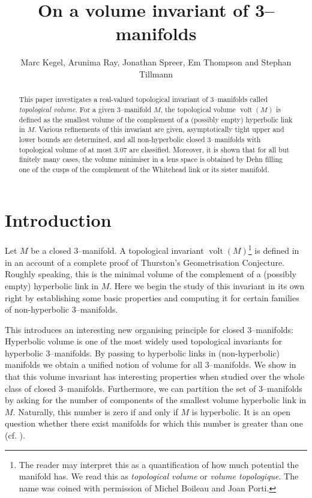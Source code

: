 \documentclass[a4paper]{gtart}
\theoremstyle{definition}
\theoremstyle{remark}
\numberwithin{equation}{section}
\DeclareMathOperator{\volt}{volt}
\begin{document}
\title{On a volume invariant of 3--manifolds}
\author{Marc Kegel, Arunima Ray, Jonathan Spreer, Em Thompson and Stephan Tillmann}

\begin{abstract}
This paper investigates a real-valued topological invariant of $3$--manifolds called \emph{topological volume}. For a given $3$--manifold $M$, the topological volume $\volt(M)$ is defined as the smallest volume of the complement of a (possibly empty) hyperbolic link in $M$. Various refinements of this invariant are given, asymptotically tight upper and lower bounds are determined, and all non-hyperbolic closed $3$--manifolds with topological volume of at most $3.07$ are classified. Moreover, it is shown that for all but finitely many cases, the volume minimiser in a lens space is obtained by Dehn filling one of the cusps of the complement of the Whitehead link or its sister manifold.
\end{abstract}



\makeshorttitle


\section{Introduction}

Let $M$ be a closed 3--manifold.
A topological invariant $\volt(M)$\footnote{The reader may interpret this as a quantification of how much potential the manifold has. We read this as \emph{topological volume} or \emph{volume topologique}. The name was coined with permission of Michel Boileau and Joan Porti.} is defined in~\cite{BBBMP} in an account of a complete proof of Thurston's Geometrisation Conjecture. Roughly speaking, this is the minimal volume of the complement of a (possibly empty) hyperbolic link in $M.$ Here we begin the study of this invariant in its own right by establishing some basic properties and computing it for certain families of non-hyperbolic 3--manifolds.

This introduces an interesting new organising principle for closed $3$--manifolds: Hyperbolic volume is one of the most widely used topological invariants for hyperbolic $3$--manifolds. By passing to hyperbolic links in (non-hyperbolic) manifolds we obtain a unified notion of volume for all $3$--manifolds. We show in  that this volume invariant has interesting properties when studied over the whole class of closed 3--manifolds. Furthermore, we can partition the set of $3$--manifolds by asking for the number of components of the smallest volume hyperbolic link in $M$. Naturally, this number is zero if and only if $M$ is hyperbolic. It is an open question whether there exist manifolds for which this number is greater than one (cf. ).
\end{document}
